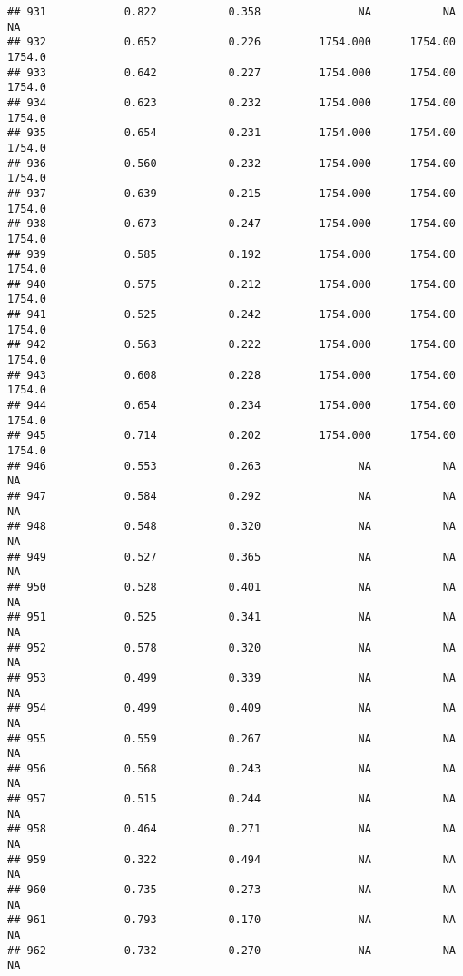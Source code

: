 \documentclass[
]{article}
\begin{document}
\begin{verbatim}
## 931            0.822           0.358               NA           NA           NA
## 932            0.652           0.226         1754.000      1754.00       1754.0
## 933            0.642           0.227         1754.000      1754.00       1754.0
## 934            0.623           0.232         1754.000      1754.00       1754.0
## 935            0.654           0.231         1754.000      1754.00       1754.0
## 936            0.560           0.232         1754.000      1754.00       1754.0
## 937            0.639           0.215         1754.000      1754.00       1754.0
## 938            0.673           0.247         1754.000      1754.00       1754.0
## 939            0.585           0.192         1754.000      1754.00       1754.0
## 940            0.575           0.212         1754.000      1754.00       1754.0
## 941            0.525           0.242         1754.000      1754.00       1754.0
## 942            0.563           0.222         1754.000      1754.00       1754.0
## 943            0.608           0.228         1754.000      1754.00       1754.0
## 944            0.654           0.234         1754.000      1754.00       1754.0
## 945            0.714           0.202         1754.000      1754.00       1754.0
## 946            0.553           0.263               NA           NA           NA
## 947            0.584           0.292               NA           NA           NA
## 948            0.548           0.320               NA           NA           NA
## 949            0.527           0.365               NA           NA           NA
## 950            0.528           0.401               NA           NA           NA
## 951            0.525           0.341               NA           NA           NA
## 952            0.578           0.320               NA           NA           NA
## 953            0.499           0.339               NA           NA           NA
## 954            0.499           0.409               NA           NA           NA
## 955            0.559           0.267               NA           NA           NA
## 956            0.568           0.243               NA           NA           NA
## 957            0.515           0.244               NA           NA           NA
## 958            0.464           0.271               NA           NA           NA
## 959            0.322           0.494               NA           NA           NA
## 960            0.735           0.273               NA           NA           NA
## 961            0.793           0.170               NA           NA           NA
## 962            0.732           0.270               NA           NA           NA

\end{verbatim}
\end{document}
